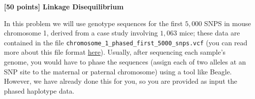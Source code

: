 {\bf [50 points] Linkage Disequilibrium}

\vspace{2mm}
In this problem we will use genotype sequences for the first $5,000$ SNPS in mouse chromosome 1, derived from a case study involving $1,063$ mice; these data are contained in the file \texttt{chromosome\_1\_phased\_first\_5000\_snps.vcf} (you can read more about this file format \href{http://faculty.washington.edu/browning/beagle/intro-to-vcf.html}{here}). Usually, after sequencing each sample's genome, you would have to phase the sequences (assign each of two alleles at an SNP site to the maternal or paternal chromosome) using a tool like Beagle. However, we have already done this for you, so you are provided as input the phased haplotype data. \\


\vspace{2mm}


